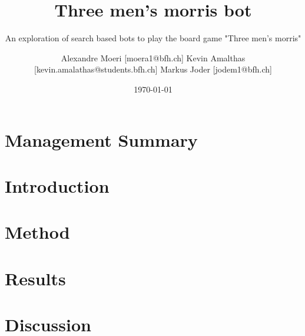 \documentclass[
  12pt, %
  a4paper, %
  oneside,
  numbers=noenddot, %
  BCOR=5mm, %
  parskip=half*, %
  thesis
]{bfhbook}
\author{Alexandre Moeri [moera1@bfh.ch] Kevin Amalthas [kevin.amalathas@students.bfh.ch] Markus Joder [jodem1@bfh.ch]}
\title{Three men's morris bot}
\subtitle{An exploration of search based bots to play the board game "Three men's morris"}
\date{\today} %
\begin{document}
\maketitle
\frontmatter %
\allowdisplaybreaks

\chapter*{Management Summary}


\tableofcontents
\sloppy
\mainmatter %

\chapter{Introduction}

\chapter{Method}

\chapter{Results}

\chapter{Discussion}


\backmatter
\listoffigures
\listoftables
\printbibliography
\end{document}
